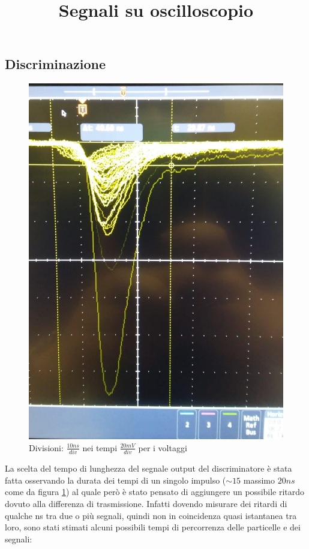 \documentclass[a4paper]{article}
\begin{document}
\subsection{Discriminazione}
\label{sec:DiscrSegn}
\begin{figure}[H]
\centering
\title{Segnali su oscilloscopio}
\begin{center}
\includegraphics[scale=0.2]{./immagini/TimeOfFlight/SegnaliOsc.jpg}
\caption{Divisioni: $\frac{10ns}{div}$ nei tempi $\frac{20mV}{div}$ per i voltaggi}
\label{fig:SegnaliOsc}
\end{center}
\end{figure}

La scelta del tempo di lunghezza del segnale output del discriminatore è stata fatta osservando la durata dei tempi di un singolo impulso ($\sim 15$ massimo $20 ns$ come da figura \ref{fig:SegnaliOsc}) al quale però è stato pensato di aggiungere un possibile ritardo dovuto alla differenza di trasmissione. Infatti dovendo misurare dei ritardi di qualche ns tra due o più segnali, quindi non in coincidenza quasi istantanea tra loro, sono stati stimati alcuni possibili tempi di percorrenza delle particelle e dei segnali:
\end{document}
